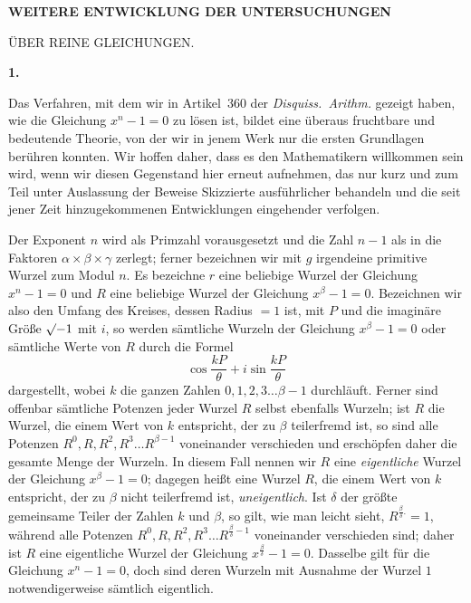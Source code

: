 \clearpage{}
\par\bigskip{}
\begin{center}\large\bfseries WEITERE ENTWICKLUNG DER UNTERSUCHUNGEN\par\medskip ÜBER REINE GLEICHUNGEN.\end{center}
\renewcommand{\BookRunningTitle}{Weitere Untersuchungen über reine Gleichungen}
\renewcommand{\Article}[1]{\par\medskip\Needspace{4\baselineskip}\pdfbookmark[1]{Art. #1}{purae-art-#1}\centerline{\textbf{#1.}}\nobreak\smallskip}

\Article{1}
Das Verfahren, mit dem wir in Artikel~360 der \emph{Disquiss.\ Arithm.} gezeigt haben, wie die Gleichung \mbox{$x^n-1=0$} zu lösen ist, bildet eine überaus fruchtbare und bedeutende Theorie, von der wir in jenem Werk nur die ersten Grundlagen berühren konnten. Wir hoffen daher, dass es den Mathematikern willkommen sein wird, wenn wir diesen Gegenstand hier erneut aufnehmen, das nur kurz und zum Teil unter Auslassung der Beweise Skizzierte ausführlicher behandeln und die seit jener Zeit hinzugekommenen Entwicklungen eingehender verfolgen.

Der Exponent $n$ wird als Primzahl vorausgesetzt und die Zahl $n-1$ als in die Faktoren $\alpha\times\beta\times\gamma$ zerlegt; ferner bezeichnen wir mit $g$ irgendeine primitive Wurzel zum Modul $n$. Es bezeichne $r$ eine beliebige Wurzel der Gleichung \mbox{$x^n-1=0$} und $R$ eine beliebige Wurzel der Gleichung \mbox{$x^\beta-1=0$}. Bezeichnen wir also den Umfang des Kreises, dessen Radius $=1$ ist, mit $P$ und die imaginäre Größe $\mathord{\surd}{-1}$ mit $i$, so werden sämtliche Wurzeln der Gleichung \mbox{$x^\beta-1=0$} oder sämtliche Werte von $R$ durch die Formel
\[
\cos\frac{kP}{\theta}+i\sin\frac{kP}{\theta}
\]
dargestellt, wobei $k$ die ganzen Zahlen $0,1,2,3\ldots\beta-1$ durchläuft. Ferner sind offenbar sämtliche Potenzen jeder Wurzel $R$ selbst ebenfalls Wurzeln; ist $R$ die Wurzel, die einem Wert von $k$ entspricht, der zu $\beta$ teilerfremd ist, so sind alle Potenzen $R^0,R,R^2,R^3\ldots R^{\beta-1}$ voneinander verschieden und erschöpfen daher die gesamte Menge der Wurzeln. In diesem Fall nennen wir $R$ eine \emph{eigentliche} Wurzel der Gleichung \mbox{$x^\beta-1=0$}; dagegen heißt eine Wurzel $R$,
die einem Wert von $k$ entspricht, der zu $\beta$ nicht teilerfremd ist, \emph{uneigentlich}. Ist $\delta$ der größte gemeinsame Teiler der Zahlen $k$ und $\beta$, so gilt, wie man leicht sieht, $R^{\frac\beta\delta .}=1$, während alle Potenzen $R^0,R,R^2,R^3\ldots R^{\frac\beta\delta-1}$ voneinander verschieden sind; daher ist $R$ eine eigentliche Wurzel der Gleichung \mbox{$x^{\frac\beta\delta}-1=0$}. Dasselbe gilt für die Gleichung \mbox{$x^n-1=0$}, doch sind deren Wurzeln mit Ausnahme der Wurzel $1$ notwendigerweise sämtlich eigentlich.

